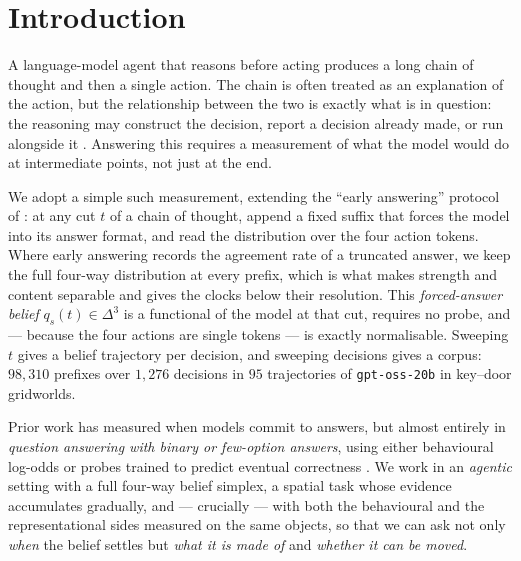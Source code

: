 \documentclass{article}
\newcommand{\qvec}{q}
\begin{document}
\section{Introduction}

A language-model agent that reasons before acting produces a long chain of thought and
then a single action. The chain is often treated as an explanation of the action, but the
relationship between the two is exactly what is in question: the reasoning may construct
the decision, report a decision already made, or run alongside it \citep{turpin2023,
lanham2023}. Answering this requires a measurement of what the model would do at
intermediate points, not just at the end.

We adopt a simple such measurement, extending the ``early answering'' protocol of
\citet{lanham2023}: at any cut $t$ of a chain of thought, append a fixed suffix that forces
the model into its answer format, and read the distribution over the four action tokens.
Where early answering records the agreement rate of a truncated answer, we keep the full
four-way distribution at every prefix, which is what makes strength and content separable
and gives the clocks below their resolution. This \emph{forced-answer belief} $\qvec_s(t) \in \Delta^3$ is a
functional of the model at that cut, requires no probe, and --- because the four actions
are single tokens --- is exactly normalisable. Sweeping $t$ gives a belief trajectory per
decision, and sweeping decisions gives a corpus: $98{,}310$ prefixes over $1{,}276$
decisions in $95$ trajectories of \texttt{gpt-oss-20b} in key--door gridworlds.

Prior work has measured when models commit to answers, but almost entirely in
\emph{question answering with binary or few-option answers}, using either behavioural
log-odds \citep{commit2026} or probes trained to predict eventual correctness
\citep{temporal2025}. We work in an \emph{agentic} setting with a full four-way belief
simplex, a spatial task whose evidence accumulates gradually, and --- crucially --- with
both the behavioural and the representational sides measured on the same objects, so that
we can ask not only \emph{when} the belief settles but \emph{what it is made of} and
\emph{whether it can be moved}.
\end{document}
